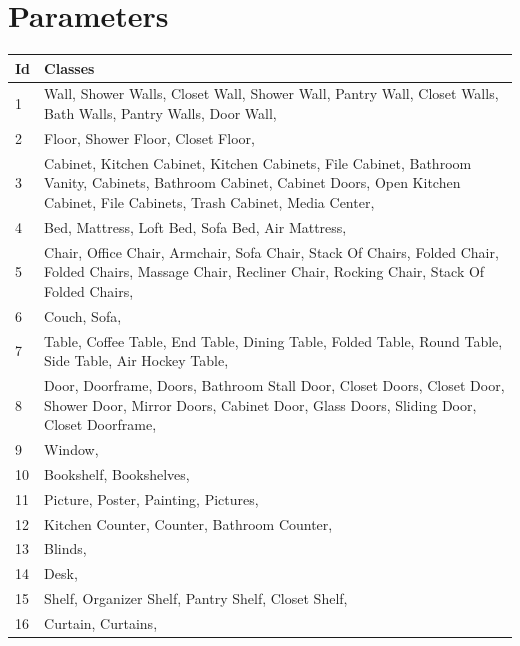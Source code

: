     \chapter{Parameters}
        \begin{table}[h]
    	\begin{center}
    		\begin{tabular}{ | l | p{14cm} |}
    			\hline
    			
    			\cellcolor{purple!30}Id & \cellcolor{purple!30}Classes \\ \hline
    			
    			1 & Wall, Shower Walls, Closet Wall, Shower Wall, Pantry Wall, Closet Walls, Bath Walls, Pantry Walls, Door Wall, \\ \hline
    			2 & Floor, Shower Floor, Closet Floor, \\ \hline
    			3 & Cabinet, Kitchen Cabinet, Kitchen Cabinets, File Cabinet, Bathroom Vanity, Cabinets, Bathroom Cabinet, Cabinet Doors, Open Kitchen Cabinet, File Cabinets, Trash Cabinet, Media Center, \\ \hline
    			4 & Bed, Mattress, Loft Bed, Sofa Bed, Air Mattress, \\ \hline
    			5 & Chair, Office Chair, Armchair, Sofa Chair, Stack Of Chairs, Folded Chair, Folded Chairs, Massage Chair, Recliner Chair, Rocking Chair, Stack Of Folded Chairs, \\ \hline
    			6 & Couch, Sofa, \\ \hline
    			7 & Table, Coffee Table, End Table, Dining Table, Folded Table, Round Table, Side Table, Air Hockey Table, \\ \hline
    			8 & Door, Doorframe, Doors, Bathroom Stall Door, Closet Doors, Closet Door, Shower Door, Mirror Doors, Cabinet Door, Glass Doors, Sliding Door, Closet Doorframe, \\ \hline
    			9 & Window, \\ \hline
    			10 & Bookshelf, Bookshelves, \\ \hline
    			11 & Picture, Poster, Painting, Pictures, \\ \hline
    			12 & Kitchen Counter, Counter, Bathroom Counter, \\ \hline
    			13 & Blinds, \\ \hline
    			14 & Desk, \\ \hline
    			15 & Shelf, Organizer Shelf, Pantry Shelf, Closet Shelf, \\ \hline
    			16 & Curtain, Curtains, \\ \hline

\end{tabular}
\end{center}
\end{table}
